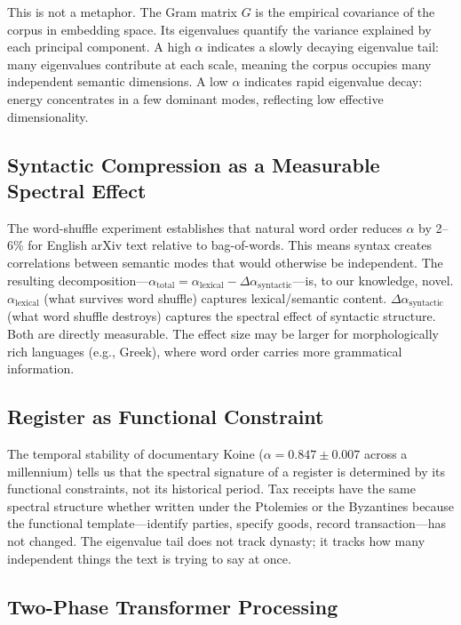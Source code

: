 \documentclass[12pt,letterpaper]{article}
\newcommand{\al}{\alpha}
\newcommand{\dalpha}{\Delta\alpha}
\begin{document}
This is not a metaphor.  The Gram matrix $G$ is the empirical
covariance of the corpus in embedding space.  Its eigenvalues
quantify the variance explained by each principal component.  A high
$\al$ indicates a slowly decaying eigenvalue tail: many eigenvalues
contribute at each scale, meaning the corpus occupies many
independent semantic dimensions.  A low $\al$ indicates rapid
eigenvalue decay: energy concentrates in a few dominant modes,
reflecting low effective dimensionality.

\subsection{Syntactic Compression as a Measurable Spectral Effect}

The word-shuffle experiment establishes that natural word order
reduces $\al$ by 2--6\% for English arXiv text relative to
bag-of-words.  This means syntax creates correlations between
semantic modes that would otherwise be independent.  The resulting
decomposition---$\al_{\text{total}} = \al_{\text{lexical}} -
\dalpha_{\text{syntactic}}$---is, to our knowledge, novel.
$\al_{\text{lexical}}$ (what survives word shuffle) captures
lexical/semantic content.  $\dalpha_{\text{syntactic}}$ (what word
shuffle destroys) captures the spectral effect of syntactic
structure.  Both are directly measurable.  The effect size may be
larger for morphologically rich languages (e.g., Greek), where word
order carries more grammatical information.

\subsection{Register as Functional Constraint}

The temporal stability of documentary Koine ($\al = 0.847 \pm 0.007$
across a millennium) tells us that the spectral signature of a
register is determined by its functional constraints, not its
historical period.  Tax receipts have the same spectral structure
whether written under the Ptolemies or the Byzantines because the
functional template---identify parties, specify goods, record
transaction---has not changed.  The eigenvalue tail does not track
dynasty; it tracks how many independent things the text is trying to
say at once.

\subsection{Two-Phase Transformer Processing}
\end{document}
